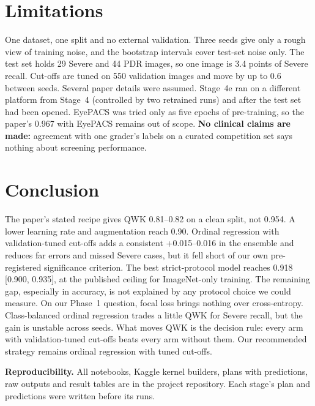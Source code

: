 \documentclass[conference]{IEEEtran}
\begin{document}
\section{Limitations}
One dataset, one split and no external validation. Three seeds give only a rough view of training noise, and the
bootstrap intervals cover test-set noise only. The test set holds 29 Severe and 44 PDR images, so one image is 3.4
points of Severe recall. Cut-offs are tuned on 550 validation images and move by up to 0.6 between seeds. Several
paper details were assumed. Stage~4e ran on a different platform from Stage~4 (controlled by two retrained runs) and
after the test set had been opened. EyePACS was tried only as five epochs of pre-training, so the paper's 0.967 with
EyePACS remains out of scope. \textbf{No clinical claims are made:} agreement with one grader's labels on a curated
competition set says nothing about screening performance.

\section{Conclusion}
The paper's stated recipe gives QWK 0.81--0.82 on a clean split, not 0.954. A lower learning rate and augmentation
reach 0.90. Ordinal regression with validation-tuned cut-offs adds a consistent +0.015--0.016 in the ensemble and
reduces far errors and missed Severe cases, but it fell short of our own pre-registered significance criterion. The
best strict-protocol model reaches 0.918 [0.900, 0.935], at the published ceiling for ImageNet-only training. The
remaining gap, especially in accuracy, is not explained by any protocol choice we could measure. On our Phase~1
question, focal loss brings nothing over cross-entropy. Class-balanced ordinal regression trades a little QWK for
Severe recall, but the gain is unstable across seeds. What moves QWK is the decision rule: every arm with
validation-tuned cut-offs beats every arm without them. Our recommended strategy remains ordinal regression with
tuned cut-offs.

\textbf{Reproducibility.} All notebooks, Kaggle kernel builders, plans with predictions, raw outputs and result tables
are in the project repository. Each stage's plan and predictions were written before its runs.



\end{document}
